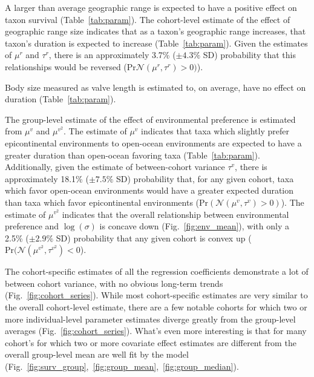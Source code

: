 \documentclass[11pt]{article}
\begin{document}
A larger than average geographic range is expected to have a positive effect on taxon survival (Table~\ref{tab:param}). The cohort-level estimate of the effect of geographic range size indicates that as a taxon's geographic range increases, that taxon's duration is expected to increase (Table~\ref{tab:param}). Given the estimates of \(\mu^{r}\) and \(\tau^{r}\), there is an approximately 3.7\% (\(\pm 4.3\%\) SD) probability that this relationships would be reversed (\(\mathrm{Pr}\mathcal{N}(\mu^{r}, \tau^{r}) > 0)\)). 

Body size measured as valve length is estimated to, on average, have no effect on duration (Table~\ref{tab:param}).

The group-level estimate of the effect of environmental preference is estimated from \(\mu^{v}\) and \(\mu^{v^{2}}\). The estimate of \(\mu^{v}\) indicates that taxa which slightly prefer epicontinental environments to open-ocean environments are expected to have a greater duration than open-ocean favoring taxa (Table~\ref{tab:param}). Additionally, given the estimate of between-cohort variance \(\tau^{v}\), there is approximately 18.1\% (\(\pm 7.5\%\) SD) probability that, for any given cohort, taxa which favor open-ocean environments would have a greater expected duration than taxa which favor epicontinental environments (\(\mathrm{Pr}(\mathcal{N}(\mu^{v}, \tau^{v}) > 0)\)). The estimate of \(\mu^{v^{2}}\) indicates that the overall relationship between environmental preference and \(\log(\sigma)\) is concave down (Fig.~\ref{fig:env_mean}), with only a 2.5\% (\(\pm 2.9\%\) SD) probability that any given cohort is convex up (\(\mathrm{Pr}(\mathcal{N}(\mu^{v^{2}}, \tau^{v^{2}}) < 0\)).

The cohort-specific estimates of all the regression coefficients demonstrate a lot of between cohort variance, with no obvious long-term trends (Fig.~\ref{fig:cohort_series}). While most cohort-specific estimates are very similar to the overall cohort-level estimate, there are a few notable cohorts for which two or more individual-level parameter estimates diverge greatly from the group-level averages (Fig.~\ref{fig:cohort_series}). What's even more interesting is that for many cohort's for which two or more covariate effect estimates are different from the overall group-level mean are well fit by the model (Fig.~\ref{fig:surv_group},~\ref{fig:group_mean},~\ref{fig:group_median}).
\end{document}
